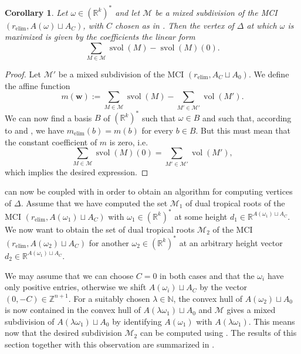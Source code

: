 \documentclass[a4paper]{article}
\newtheorem{corollary}{Corollary}
\theoremstyle{remark}
\def\NN{\mathbb{N}}
\def\RR{\mathbb{R}}
\def\ZZ{\mathbb{Z}}
\DeclareMathOperator{\vol}{vol}
\DeclareMathOperator{\svol}{svol}
\def\melim{m_{\text{elim}}}
\begin{document}
\begin{corollary}
  \label{cor:vorac}
  Let $\omega\in (\RR^{k})^*$ and let $\mathcal{M}$ be a mixed subdivision
  of the MCI $(r_{\text{elim}},A(\omega)\sqcup A_C)$, with $C$ chosen as in
  . Then the vertex of $\Delta$ at which $\omega$ is maximized is
  given by the coefficients the linear form
  \[\sum_{M\in \mathcal{M}}\svol(M)-\svol(M)(0).\]
\end{corollary}
\begin{proof}
  Let $\mathcal{M}'$ be a mixed subdivision of the MCI
  $(r_{\text{elim}},A_C\sqcup A_0)$.  We define the affine function
  \[m(\mathbf{w}) := \sum_{M\in \mathcal{M}}\svol(M) - \sum_{M'\in \mathcal{M}'}\vol(M').\]
  We can now find a basis $B$ of $(\RR^k)^{*}$ such that $\omega\in B$ and such that, according to  and , we have
  $\melim(b) = m(b)$ for every $b\in B$. But this must mean
  that the constant coefficient of $m$ is zero, i.e.
  \[\sum_{M\in \mathcal{M}}\svol(M)(0) = \sum_{M'\in \mathcal{M}'}\vol(M'),\]
  which implies the desired expression.
\end{proof}

 can now be coupled with  in order to
obtain an algorithm for computing vertices of $\Delta$. Assume that we have
computed the set $\mathcal{M}_1$ of dual tropical roots of the MCI
$(r_{\text{elim}},A(\omega_1)\sqcup A_C)$ with
$\omega_1\in (\RR^{k})^{*}$ at some height
$d_1\in \RR^{A(\omega_1)\sqcup A_C}$. We now want to obtain the set of dual
tropical roots $\mathcal{M}_2$ of the MCI
$(r_{\text{elim}},A(\omega_2)\sqcup A_C)$ for another
$\omega_2\in (\RR^{k})^{*}$ at an arbitrary height vector
$d_2\in \RR^{A(\omega_1)\sqcup A_C}$.

We may assume that we can choose $C = 0$ in both cases and that the
$\omega_i$ have only positive entries, otherwise we shift
$A(\omega_i)\sqcup A_C$ by the vector $(0,-C)\in \ZZ^{n+1}$. For a suitably chosen
$\lambda\in \NN$, the convex hull of $A(\omega_2)\sqcup A_0$ is now contained in the
convex hull of $A(\lambda \omega_1)\sqcup A_0$ and $\mathcal{M}$ gives a mixed subdivision of
$A(\lambda \omega_1)\sqcup A_0$ by identifying $A(\omega_1)$ with
$A(\lambda \omega_1)$. This means now that the desired subdivision
$\mathcal{M}_2$ can be computed using . The results of
this section together with this observation are summarized in
.
\end{document}
